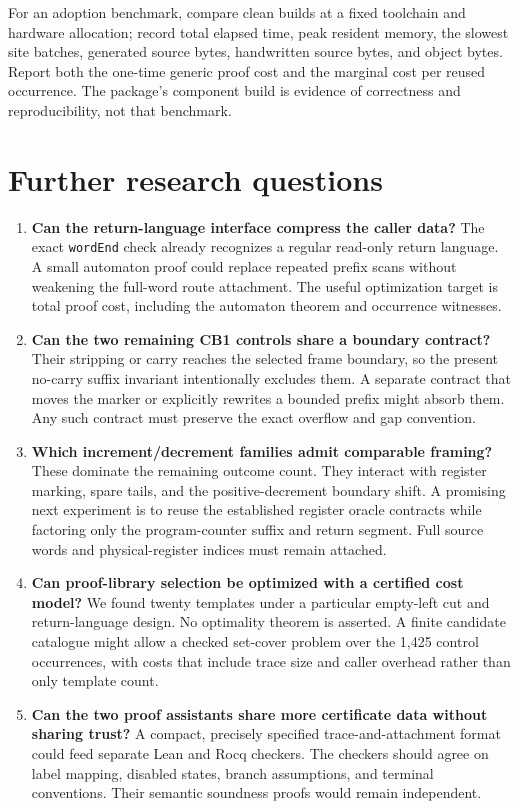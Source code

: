 \documentclass[11pt]{article}
\theoremstyle{definition}\newtheorem{definition}[theorem]{Definition}
\theoremstyle{remark}\newtheorem{remark}[theorem]{Remark}
\newcommand{\code}[1]{\nolinkurl{#1}}
\begin{document}
For an adoption benchmark, compare clean builds at a fixed toolchain and hardware allocation; record total elapsed time, peak resident memory, the slowest site batches, generated source bytes, handwritten source bytes, and object bytes. Report both the one-time generic proof cost and the marginal cost per reused occurrence. The package's component build is evidence of correctness and reproducibility, not that benchmark.

\section{Further research questions}

\begin{enumerate}
\item \textbf{Can the return-language interface compress the caller data?} The exact \code{wordEnd} check already recognizes a regular read-only return language. A small automaton proof could replace repeated prefix scans without weakening the full-word route attachment. The useful optimization target is total proof cost, including the automaton theorem and occurrence witnesses.
\item \textbf{Can the two remaining CB1 controls share a boundary contract?} Their stripping or carry reaches the selected frame boundary, so the present no-carry suffix invariant intentionally excludes them. A separate contract that moves the marker or explicitly rewrites a bounded prefix might absorb them. Any such contract must preserve the exact overflow and gap convention.
\item \textbf{Which increment/decrement families admit comparable framing?} These dominate the remaining outcome count. They interact with register marking, spare tails, and the positive-decrement boundary shift. A promising next experiment is to reuse the established register oracle contracts while factoring only the program-counter suffix and return segment. Full source words and physical-register indices must remain attached.
\item \textbf{Can proof-library selection be optimized with a certified cost model?} We found twenty templates under a particular empty-left cut and return-language design. No optimality theorem is asserted. A finite candidate catalogue might allow a checked set-cover problem over the 1,425 control occurrences, with costs that include trace size and caller overhead rather than only template count.
\item \textbf{Can the two proof assistants share more certificate data without sharing trust?} A compact, precisely specified trace-and-attachment format could feed separate Lean and Rocq checkers. The checkers should agree on label mapping, disabled states, branch assumptions, and terminal conventions. Their semantic soundness proofs would remain independent.

\end{enumerate}
\end{document}
